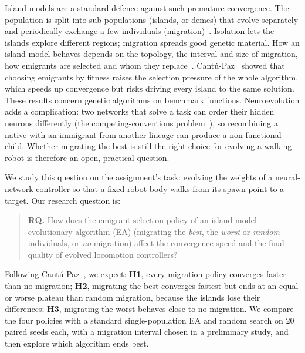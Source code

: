 \documentclass[sigconf]{acmart}
\begin{document}
Island models are a standard defence against such premature convergence. The
population is split into sub-populations (islands, or demes) that evolve
separately and periodically exchange a few individuals
(migration)~\cite{cantupaz1998survey,alba2002parallelism,whitley1999island}.
Isolation lets the islands explore different regions; migration spreads good
genetic material. How an island model behaves depends on the topology, the
interval and size of migration, how emigrants are selected and whom they
replace~\cite{skolicki2005influence}. Cantú-Paz~\cite{cantupaz2001migration}
showed that choosing emigrants by fitness raises the selection pressure of the
whole algorithm, which speeds up convergence but risks driving every island to
the same solution. These results concern genetic algorithms on benchmark
functions. Neuroevolution adds a complication: two networks that solve a task can
order their hidden neurons differently (the competing-conventions
problem~\cite{schaffer1992combinations}), so recombining a native with an
immigrant from another lineage can produce a non-functional child. Whether migrating
the best is still the right choice for evolving a walking robot is therefore
an open, practical question.

We study this question on the assignment's task: evolving the weights of a
neural-network controller so that a fixed robot body walks from its spawn
point to a target. Our research question is:

\begin{quote}
\textbf{RQ.} How does the emigrant-selection policy of an island-model evolutionary
algorithm (EA)
(migrating the \emph{best}, the \emph{worst} or \emph{random} individuals, or
\emph{no} migration) affect the convergence speed and the final quality of
evolved locomotion controllers?
\end{quote}

\noindent Following Cantú-Paz~\cite{cantupaz2001migration}, we expect:
\textbf{H1}, every migration policy converges faster than no migration;
\textbf{H2}, migrating the best converges fastest but ends at an equal or
worse plateau than random migration, because the islands lose their
differences; \textbf{H3}, migrating the worst behaves close to no migration.
We compare the four policies with a standard single-population EA and random
search on 20 paired seeds each, with a migration interval chosen in a
preliminary study, and then explore which algorithm ends best.

\end{document}
